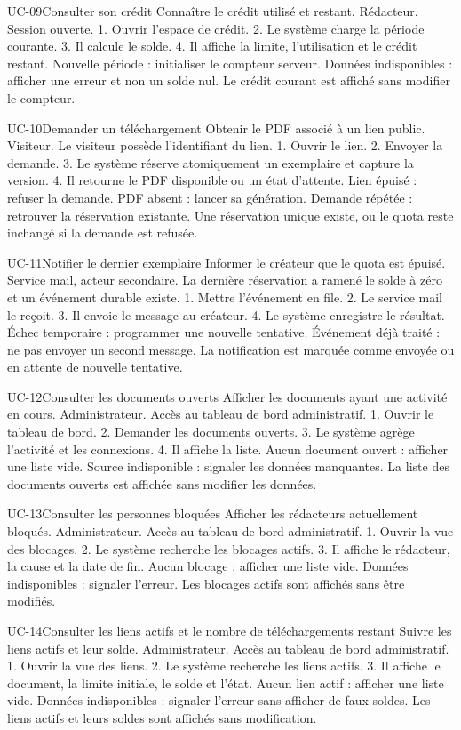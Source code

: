 \fichecas
{UC-09}{Consulter son crédit}
{Connaître le crédit utilisé et restant.}
{Rédacteur.}
{Session ouverte.}
{1. Ouvrir l'espace de crédit. 2. Le système charge la période courante. 3. Il calcule le solde. 4. Il affiche la limite, l'utilisation et le crédit restant.}
{Nouvelle période : initialiser le compteur serveur. Données indisponibles : afficher une erreur et non un solde nul.}
{Le crédit courant est affiché sans modifier le compteur.}

\fichecas
{UC-10}{Demander un téléchargement}
{Obtenir le PDF associé à un lien public.}
{Visiteur.}
{Le visiteur possède l'identifiant du lien.}
{1. Ouvrir le lien. 2. Envoyer la demande. 3. Le système réserve atomiquement un exemplaire et capture la version. 4. Il retourne le PDF disponible ou un état d'attente.}
{Lien épuisé : refuser la demande. PDF absent : lancer sa génération. Demande répétée : retrouver la réservation existante.}
{Une réservation unique existe, ou le quota reste inchangé si la demande est refusée.}

\fichecas
{UC-11}{Notifier le dernier exemplaire}
{Informer le créateur que le quota est épuisé.}
{Service mail, acteur secondaire.}
{La dernière réservation a ramené le solde à zéro et un événement durable existe.}
{1. Mettre l'événement en file. 2. Le service mail le reçoit. 3. Il envoie le message au créateur. 4. Le système enregistre le résultat.}
{Échec temporaire : programmer une nouvelle tentative. Événement déjà traité : ne pas envoyer un second message.}
{La notification est marquée comme envoyée ou en attente de nouvelle tentative.}

\fichecas
{UC-12}{Consulter les documents ouverts}
{Afficher les documents ayant une activité en cours.}
{Administrateur.}
{Accès au tableau de bord administratif.}
{1. Ouvrir le tableau de bord. 2. Demander les documents ouverts. 3. Le système agrège l'activité et les connexions. 4. Il affiche la liste.}
{Aucun document ouvert : afficher une liste vide. Source indisponible : signaler les données manquantes.}
{La liste des documents ouverts est affichée sans modifier les données.}

\fichecas
{UC-13}{Consulter les personnes bloquées}
{Afficher les rédacteurs actuellement bloqués.}
{Administrateur.}
{Accès au tableau de bord administratif.}
{1. Ouvrir la vue des blocages. 2. Le système recherche les blocages actifs. 3. Il affiche le rédacteur, la cause et la date de fin.}
{Aucun blocage : afficher une liste vide. Données indisponibles : signaler l'erreur.}
{Les blocages actifs sont affichés sans être modifiés.}

\fichecas
{UC-14}{Consulter les liens actifs et le nombre de téléchargements restant}
{Suivre les liens actifs et leur solde.}
{Administrateur.}
{Accès au tableau de bord administratif.}
{1. Ouvrir la vue des liens. 2. Le système recherche les liens actifs. 3. Il affiche le document, la limite initiale, le solde et l'état.}
{Aucun lien actif : afficher une liste vide. Données indisponibles : signaler l'erreur sans afficher de faux soldes.}
{Les liens actifs et leurs soldes sont affichés sans modification.}
